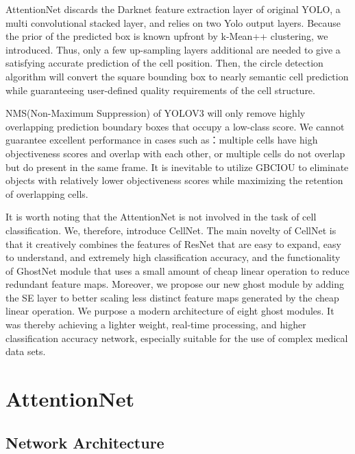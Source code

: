 AttentionNet discards the Darknet feature extraction layer of original YOLO, a multi convolutional stacked layer, and relies on two Yolo output layers. Because the prior of the predicted box is known upfront by k-Mean++ clustering, we introduced. Thus, only a few up-sampling layers additional are needed to give a satisfying accurate prediction of the cell position. Then, the circle detection algorithm will convert the square bounding box to nearly semantic cell prediction while guaranteeing user-defined quality requirements of the cell structure.

NMS(Non-Maximum Suppression) of YOLOV3 will only remove highly overlapping prediction boundary boxes that occupy a low-class score. We cannot guarantee excellent performance in cases such as：multiple cells have high objectiveness scores and overlap with each other, or multiple cells do not overlap but do present in the same frame. It is inevitable to utilize GBCIOU to eliminate objects with relatively lower objectiveness scores while maximizing the retention of overlapping cells.

It is worth noting that the AttentionNet is not involved in the task of cell classification. We, therefore, introduce CellNet. The main novelty of CellNet is that it creatively combines the features of ResNet\cite{20} that are easy to expand, easy to understand, and extremely high classification accuracy, and the functionality of GhostNet\cite{19} module that uses a small amount of cheap linear operation to reduce redundant feature maps. Moreover, we propose our new ghost module by adding the SE layer to better scaling less distinct feature maps generated by the cheap linear operation. We purpose a modern architecture of eight ghost modules. It was thereby achieving a lighter weight, real-time processing, and higher classification accuracy network, especially suitable for the use of complex medical data sets.


\section{AttentionNet}
\label{sec:lorem}


\subsection{Network Architecture} %
\label{sub:citations}

